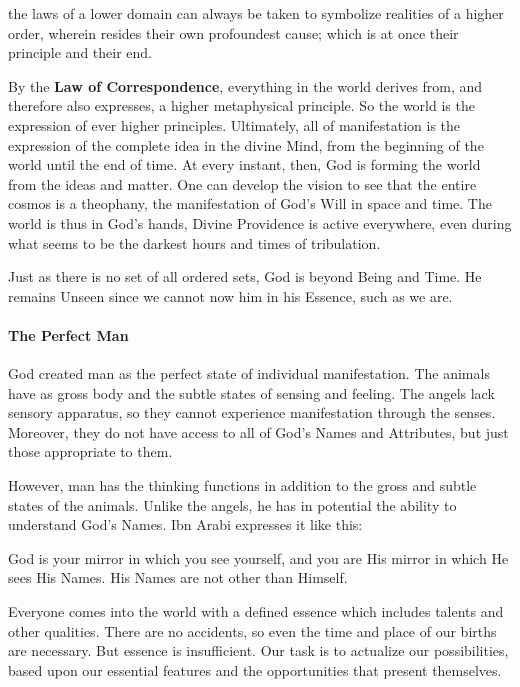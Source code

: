 \begin{quotex}
the laws of a lower domain can always be taken to symbolize realities of a higher order, wherein resides their own profoundest cause; which is at once their principle and their end.
\end{quotex}


By the \textbf{Law of Correspondence}, everything in the world derives from, and therefore also expresses, a higher metaphysical principle. So the world is the expression of ever higher principles. Ultimately, all of manifestation is the expression of the complete idea in the divine Mind, from the beginning of the world until the end of time. At every instant, then, God is forming the world from the ideas and matter. One can develop the vision to see that the entire cosmos is a theophany, the manifestation of God's Will in space and time. The world is thus in God's hands, Divine Providence is active everywhere, even during what seems to be the darkest hours and times of tribulation.

Just as there is no set of all ordered sets, God is beyond Being and Time. He remains Unseen since we cannot now him in his Essence, such as we are.

\paragraph{The Perfect Man}


God created man as the perfect state of individual manifestation. The animals have as gross body and the subtle states of sensing and feeling. The angels lack sensory apparatus, so they cannot experience manifestation through the senses. Moreover, they do not have access to all of God's Names and Attributes, but just those appropriate to them.

However, man has the thinking functions in addition to the gross and subtle states of the animals. Unlike the angels, he has in potential the ability to understand God's Names. Ibn Arabi expresses it like this:

\begin{quotex}
God is your mirror in which you see yourself, and you are His mirror in which He sees His Names. His Names are not other than Himself.
\end{quotex}


Everyone comes into the world with a defined essence which includes talents and other qualities. There are no accidents, so even the time and place of our births are necessary. But essence is insufficient. Our task is to actualize our possibilities, based upon our essential features and the opportunities that present themselves.

